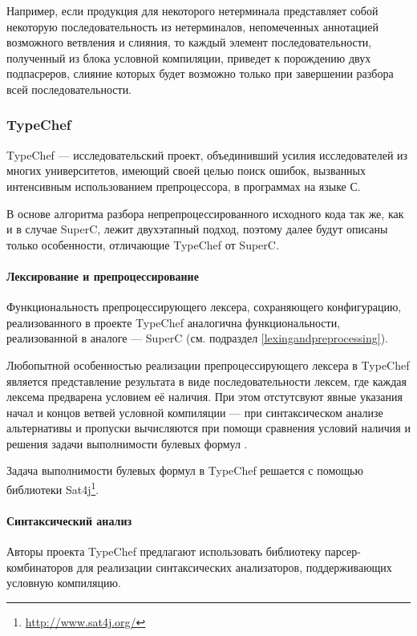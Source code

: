 Например, если продукция для некоторого нетерминала представляет собой некоторую последовательность из нетерминалов, непомеченных аннотацией возможного ветвления и слияния, то каждый элемент последовательности, полученный из блока условной компиляции, приведет к порождению двух подпасреров, слияние которых будет возможно только при завершении разбора всей последовательности. 

\subsubsection{TypeChef}

TypeChef --- исследовательский проект, объединивший усилия исследователей из многих университетов, имеющий своей целью поиск ошибок, вызванных интенсивным использованием препроцессора, в программах на языке С.

В основе алгоритма разбора непрепроцессированного исходного кода так же, как и в случае SuperC, лежит двухэтапный подход, поэтому далее будут описаны только особенности, отличающие TypeChef от SuperC.

\paragraph{Лексирование и препроцессирование}

Функциональность препроцессирующего лексера, сохраняющего конфигурацию, реализованного в проекте TypeChef аналогична функциональности, реализованной в аналоге --- SuperC (см. подраздел \ref{lexingandpreprocessing}).

Любопытной особенностью реализации препроцессирующего лексера в TypeChef является представление результата в виде последовательности лексем, где каждая лексема предварена условием её наличия. При этом отстутсвуют явные указания начал и концов ветвей условной компиляции --- при синтаксическом анализе альтернативы и пропуски вычисляются при помощи сравнения условий наличия и решения задачи выполнимости булевых формул \cite{garey}.

Задача выполнимости булевых формул в TypeChef решается с помощью библиотеки Sat4j\footnote{\url{http://www.sat4j.org/}}.

\paragraph{Синтаксический анализ}

Авторы проекта TypeChef предлагают использовать библиотеку парсер-комбинаторов для реализации синтаксических анализаторов, поддерживающих условную компиляцию.

